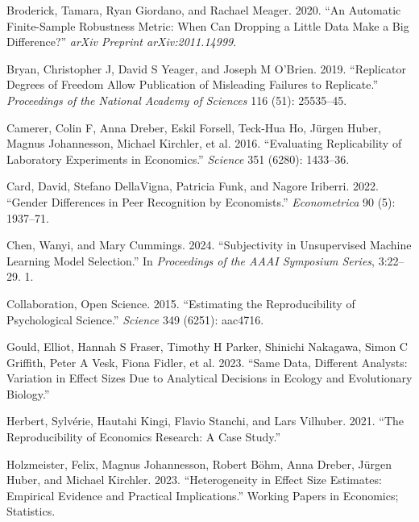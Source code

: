\documentclass[
  letterpaper,
  DIV=11,
  numbers=noendperiod]{scrartcl}
\newlength{\cslhangindent}
\newlength{\cslentryspacingunit} %
\newenvironment{CSLReferences}[2] %
 {%
  \setlength{\parindent}{0pt}
  \ifodd #1
  \let\oldpar\par
  \def\par{\hangindent=\cslhangindent\oldpar}
  \fi
  \setlength{\parskip}{#2\cslentryspacingunit}
 }%
 {}
\begin{document}
\begin{CSLReferences}{1}{0}
\leavevmode{}%
Broderick, Tamara, Ryan Giordano, and Rachael Meager. 2020. {``An
Automatic Finite-Sample Robustness Metric: When Can Dropping a Little
Data Make a Big Difference?''} \emph{arXiv Preprint arXiv:2011.14999}.

\leavevmode{}%
Bryan, Christopher J, David S Yeager, and Joseph M O'Brien. 2019.
{``Replicator Degrees of Freedom Allow Publication of Misleading
Failures to Replicate.''} \emph{Proceedings of the National Academy of
Sciences} 116 (51): 25535--45.

\leavevmode{}%
Camerer, Colin F, Anna Dreber, Eskil Forsell, Teck-Hua Ho, Jürgen Huber,
Magnus Johannesson, Michael Kirchler, et al. 2016. {``Evaluating
Replicability of Laboratory Experiments in Economics.''} \emph{Science}
351 (6280): 1433--36.

\leavevmode{}%
Card, David, Stefano DellaVigna, Patricia Funk, and Nagore Iriberri.
2022. {``Gender Differences in Peer Recognition by Economists.''}
\emph{Econometrica} 90 (5): 1937--71.

\leavevmode{}%
Chen, Wanyi, and Mary Cummings. 2024. {``Subjectivity in Unsupervised
Machine Learning Model Selection.''} In \emph{Proceedings of the AAAI
Symposium Series}, 3:22--29. 1.

\leavevmode{}%
Collaboration, Open Science. 2015. {``Estimating the Reproducibility of
Psychological Science.''} \emph{Science} 349 (6251): aac4716.

\leavevmode{}%
Gould, Elliot, Hannah S Fraser, Timothy H Parker, Shinichi Nakagawa,
Simon C Griffith, Peter A Vesk, Fiona Fidler, et al. 2023. {``Same Data,
Different Analysts: Variation in Effect Sizes Due to Analytical
Decisions in Ecology and Evolutionary Biology.''}

\leavevmode{}%
Herbert, Sylvérie, Hautahi Kingi, Flavio Stanchi, and Lars Vilhuber.
2021. {``The Reproducibility of Economics Research: A Case Study.''}

\leavevmode{}%
Holzmeister, Felix, Magnus Johannesson, Robert Böhm, Anna Dreber, Jürgen
Huber, and Michael Kirchler. 2023. {``Heterogeneity in Effect Size
Estimates: Empirical Evidence and Practical Implications.''} Working
Papers in Economics; Statistics.


\end{CSLReferences}
\end{document}
